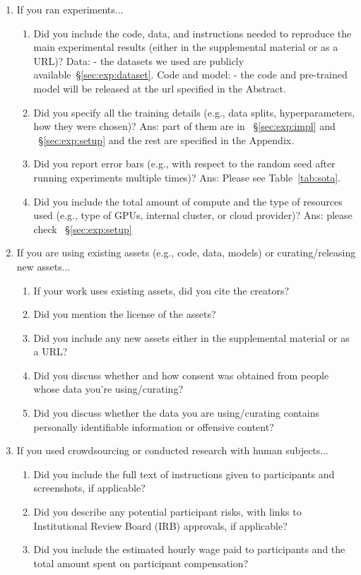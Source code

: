 \documentclass{article}
\begin{document}
\begin{enumerate}
\item If you ran experiments...
\begin{enumerate}
  \item Did you include the code, data, and instructions needed to reproduce the main experimental results (either in the supplemental material or as a URL)?
    Data: \answerYes{}- the datasets we used are publicly available~\S\ref{sec:exp:dataset}. 
    Code and model: \answerYes{}- the code and pre-trained model will be released at the url specified in the Abstract.
  \item Did you specify all the training details (e.g., data splits, hyperparameters, how they were chosen)?
    \answerYes{} Ans: part of them are in ~\S\ref{sec:exp:impl} and ~\S\ref{sec:exp:setup} and the rest are specified in the Appendix.
    \item Did you report error bars (e.g., with respect to the random seed after running experiments multiple times)? 
    \answerYes{} Ans: Please see Table~\ref{tab:sota}.
        \item Did you include the total amount of compute and the type of resources used (e.g., type of GPUs, internal cluster, or cloud provider)?
    \answerYes{} Ans: please check ~\S\ref{sec:exp:setup}
\end{enumerate}


\item If you are using existing assets (e.g., code, data, models) or curating/releasing new assets...
\begin{enumerate}
  \item If your work uses existing assets, did you cite the creators?
    \answerYes{}
  \item Did you mention the license of the assets?
    \answerYes{}
  \item Did you include any new assets either in the supplemental material or as a URL?
    \answerYes{}
  \item Did you discuss whether and how consent was obtained from people whose data you're using/curating?
    \answerNA{}
  \item Did you discuss whether the data you are using/curating contains personally identifiable information or offensive content?
    \answerNA{}
\end{enumerate}


\item If you used crowdsourcing or conducted research with human subjects...
\begin{enumerate}
  \item Did you include the full text of instructions given to participants and screenshots, if applicable?
    \answerNA{}
  \item Did you describe any potential participant risks, with links to Institutional Review Board (IRB) approvals, if applicable?
    \answerNA{}
  \item Did you include the estimated hourly wage paid to participants and the total amount spent on participant compensation?
    \answerNA{}
\end{enumerate}


\end{enumerate} 
\end{document}
